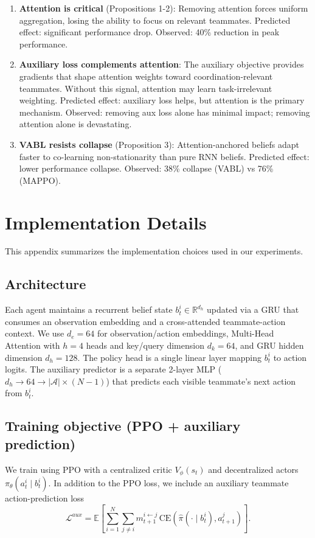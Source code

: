 \documentclass{article}
\theoremstyle{plain}
\theoremstyle{definition}
\theoremstyle{remark}
\begin{document}
\begin{enumerate}
\item \textbf{Attention is critical} (Propositions 1-2): Removing attention forces uniform aggregation, losing the ability to focus on relevant teammates. Predicted effect: significant performance drop. Observed: 40\% reduction in peak performance.

\item \textbf{Auxiliary loss complements attention}: The auxiliary objective provides gradients that shape attention weights toward coordination-relevant teammates. Without this signal, attention may learn task-irrelevant weighting. Predicted effect: auxiliary loss helps, but attention is the primary mechanism. Observed: removing aux loss alone has minimal impact; removing attention alone is devastating.

\item \textbf{VABL resists collapse} (Proposition 3): Attention-anchored beliefs adapt faster to co-learning non-stationarity than pure RNN beliefs. Predicted effect: lower performance collapse. Observed: 38\% collapse (VABL) vs 76\% (MAPPO).
\end{enumerate}

\section{Implementation Details}
\label{app:implementation}

This appendix summarizes the implementation choices used in our experiments.

\subsection{Architecture}
Each agent maintains a recurrent belief state $b_t^i \in \mathbb{R}^{d_h}$ updated via a GRU that consumes an observation embedding and a cross-attended teammate-action context. We use $d_e{=}64$ for observation/action embeddings, Multi-Head Attention with $h{=}4$ heads and key/query dimension $d_k{=}64$, and GRU hidden dimension $d_h{=}128$. The policy head is a single linear layer mapping $b_t^i$ to action logits. The auxiliary predictor is a separate 2-layer MLP ($d_h \to 64 \to |\mathcal{A}| \times (N-1)$) that predicts each visible teammate's next action from $b_t^i$.

\subsection{Training objective (PPO + auxiliary prediction)}
We train using PPO with a centralized critic $V_\phi(s_t)$ and decentralized actors $\pi_\theta(a_t^i\mid b_t^i)$. In addition to the PPO loss, we include an auxiliary teammate action-prediction loss
\begin{equation}
\mathcal{L}^{aux}
=
\mathbb{E}\left[\sum_{i=1}^N\sum_{j\neq i} m_{t+1}^{i\leftarrow j}\,\mathrm{CE}(\hat{\pi}(\cdot\mid b_t^i), a_{t+1}^j)\right].
\end{equation}
\end{document}
